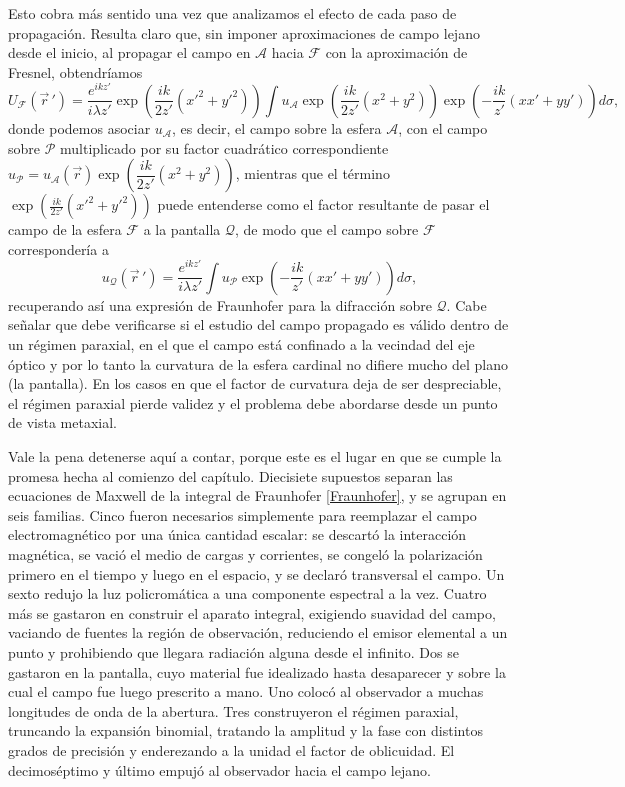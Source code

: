 Esto cobra más sentido una vez que analizamos el efecto de cada paso de propagación. Resulta claro que, sin imponer aproximaciones de campo lejano desde el inicio, al propagar el campo en $\mathcal{A}$ hacia $\mathcal{F}$ con la aproximación de Fresnel, obtendríamos
\begin{equation}
	U_{\mathcal{F}}(\vec{r}\,') = \dfrac{e^{ikz'}}{i\lambda z'} \exp\left( \frac{ik}{2z'} (x'^2 + y'^2) \right)  \int u_{\mathcal{A}}
	\exp\left( \frac{ik}{2z'} (x^2 + y^2) \right)
	\exp\left( -\frac{ik}{z'} (xx' + yy') \right)d\sigma ,
\end{equation}
donde podemos asociar $u_{\mathcal{A}}$, es decir, el campo sobre la esfera $\mathcal{A}$, con el campo sobre $\mathcal{P}$ multiplicado por su factor cuadrático correspondiente $u_{\mathcal{P}} = u_{\mathcal{A}} (\vec{r}) \exp{\left( \dfrac{ik}{2z'}(x^2+y^2) \right)}$, mientras que el término $\exp{\left( \frac{ik}{2z'} (x'^2 + y'^2) \right)}$ puede entenderse como el factor resultante de pasar el campo de la esfera $\mathcal{F}$ a la pantalla $\mathcal{Q}$, de modo que el campo sobre $\mathcal{F}$ correspondería a
\begin{equation}
	u_{\mathcal{Q}}(\vec{r}\,') = \dfrac{e^{ikz'}}{i\lambda z'} \int u_{\mathcal{P}}
	\exp\left( -\frac{ik}{z'} (xx' + yy') \right)d\sigma ,
\end{equation}
recuperando así una expresión de Fraunhofer para la difracción sobre $\mathcal{Q}$. Cabe señalar que debe verificarse si el estudio del campo propagado es válido dentro de un régimen paraxial, en el que el campo está confinado a la vecindad del eje óptico y por lo tanto la curvatura de la esfera cardinal no difiere mucho del plano (la pantalla). En los casos en que el factor de curvatura deja de ser despreciable, el régimen paraxial pierde validez y el problema debe abordarse desde un punto de vista metaxial.

Vale la pena detenerse aquí a contar, porque este es el lugar en que se cumple la promesa hecha al comienzo del capítulo. Diecisiete supuestos separan las ecuaciones de Maxwell de la integral de Fraunhofer \eqref{Fraunhofer}, y se agrupan en seis familias. Cinco fueron necesarios simplemente para reemplazar el campo electromagnético por una única cantidad escalar: se descartó la interacción magnética, se vació el medio de cargas y corrientes, se congeló la polarización primero en el tiempo y luego en el espacio, y se declaró transversal el campo. Un sexto redujo la luz policromática a una componente espectral a la vez. Cuatro más se gastaron en construir el aparato integral, exigiendo suavidad del campo, vaciando de fuentes la región de observación, reduciendo el emisor elemental a un punto y prohibiendo que llegara radiación alguna desde el infinito. Dos se gastaron en la pantalla, cuyo material fue idealizado hasta desaparecer y sobre la cual el campo fue luego prescrito a mano. Uno colocó al observador a muchas longitudes de onda de la abertura. Tres construyeron el régimen paraxial, truncando la expansión binomial, tratando la amplitud y la fase con distintos grados de precisión y enderezando a la unidad el factor de oblicuidad. El decimoséptimo y último empujó al observador hacia el campo lejano.

